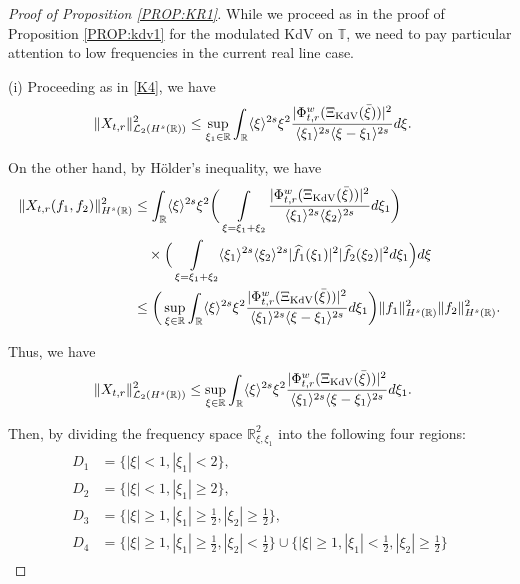 \documentclass[letterpaper, 11pt,  reqno]{amsart}
\DeclareMathOperator*{\intt}{\int}
\newcommand{\1}{\hspace{0.5mm}\text{I}\hspace{0.5mm}}
\newcommand{\noi}{\noindent}
\newcommand{\R}{\mathbb{R}}
\newcommand{\T}{\mathbb{T}}
\newcommand{\ft}{\widehat}
\newcommand{\jb}[1]
{\langle #1 \rangle}
\newcommand{\cL}{\mathcal{L}}
\newcommand{\KDV}{\text{\rm KdV} }
\numberwithin{equation}{section}
\numberwithin{theorem}{section}
\begin{document}
\begin{proof}[Proof of Proposition \ref{PROP:KR1}]
While we proceed as in the proof of Proposition \ref{PROP:kdv1}
for the modulated KdV on $\T$, 
we need to pay particular attention to low frequencies 
in the current real line case.

\medskip

\noi
(i) 
Proceeding as in \eqref{K4}, we have 
\begin{align}
\| X_{t,r} \|_{\cL_2(H^s(\R))}^2
&\leq  
\sup_{\xi_1 \in \R}
\int_\R \jb{\xi}^{2s}
\xi^2
\frac{|\Phi^{w}_{t,r} (\Xi_\KDV(\bar \xi)) |^2}{\jb{\xi_1}^{2s}\jb{\xi - \xi_1}^{2s}} d\xi.
\label{KR0a}
\end{align}

\noi
On the other hand, by H\"older's inequality, we have 
\begin{align}
\begin{split}
\| X_{t,r} (f_1,f_2)\|_{H^s(\R)}^2
&\leq
 \int_\R \jb{\xi}^{2s}
 \xi^2
 \bigg(  \intt_{\xi = \xi_1 + \xi_2}
\frac{ |\Phi^w_{t,r} ( \Xi_\KDV(\bar \xi) )|^2 }{\jb{\xi_1}^{2 s}  \jb{\xi_2}^{2s} } d\xi_1  \bigg) \\
& \quad\times 
 \Big(\intt_{\xi = \xi_1 + \xi_2}   \jb{\xi_1}^{2 s} \jb{\xi_2}^{2s}
|\ft f_1(\xi_1)  |^2  |\ft f_2(\xi_2)  |^2  d\xi_1 \Big)  d\xi  \\
&\leq
\bigg(\sup_{\xi\in\R} 
  \int_\R 
  \jb{\xi}^{ 2s }
  \xi^2
   \frac{|\Phi^{w}_{t,r} (\Xi_\KDV(\bar \xi)) |^2}{ \jb{\xi_1}^{2s}  \jb{\xi - \xi_1}^{2s}}  d\xi_1\bigg)
   \|f_1\|_{H^s(\R)}^2
\|f_2\|_{H^s(\R)}^2.
\end{split}
\label{KR0x}
\end{align}

\noi
Thus, we have 
\begin{align}
\| X_{t,r} \|_{\cL_2(H^s(\R))}^2
&\leq  
\sup_{\xi\in\R} 
  \int_\R 
  \jb{\xi}^{ 2s}
  \xi^2
   \frac{|\Phi^{w}_{t,r} (\Xi_\KDV(\bar \xi)) |^2}{ \jb{\xi_1}^{2s}  \jb{\xi - \xi_1}^{2s}}  d\xi_1.
\label{KR0b}
\end{align}

\noi
Then, 
by dividing the frequency space $\R^2_{\xi, \xi_1}$ into the following four regions:
\begin{align}
\begin{aligned}
D_1 &=  \{| \xi |< 1, |\xi_1|< 2\} , \\
D_2 &= \{| \xi |< 1, |\xi_1|\ge 2\}, \\
D_3 &= \Big\{ | \xi |\ge 1, |\xi_1|\ge \frac12, |\xi_2|\ge \frac12  \Big\},   \\
D_4 &= 
 \Big\{   |  \xi  |\ge 1, |\xi_1|\ge \frac12, |\xi_2|< \frac12  \Big\} 
 \cup
\Big\{| \xi  |\ge 1, | \xi_1 |< \frac12, |\xi_2| \ge \frac12  \Big\}
\end{aligned}
\label{KR2b}
\end{align}



\end{proof}
\end{document}
